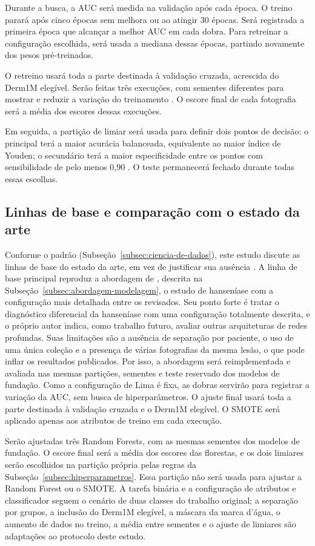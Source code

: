 Durante a busca, a AUC será medida na validação após cada época. O treino
parará após cinco épocas sem melhora ou ao atingir 30 épocas. Será
registrada a primeira época que alcançar a melhor AUC em cada dobra. Para
retreinar a configuração escolhida, será usada a mediana dessas épocas,
partindo novamente dos pesos pré-treinados.

O retreino usará toda a parte destinada à validação cruzada, acrescida do
Derm1M elegível. Serão feitas três execuções, com sementes diferentes para
mostrar e reduzir a variação do treinamento \cite{bouthillier2021}. O escore
final de cada fotografia será a média dos escores dessas execuções.

Em seguida, a partição de limiar será usada para definir dois pontos de
decisão: o principal terá a maior acurácia balanceada, equivalente ao maior
índice de Youden; o secundário terá a maior especificidade entre os pontos
com sensibilidade de pelo menos 0,90 \cite{unal2017}. O teste permanecerá
fechado durante todas essas escolhas.

\subsection{Linhas de base e comparação com o estado da arte}
\label{subsec:linhas-base}

Conforme o padrão (Subseção~\ref{subsec:ciencia-de-dados}), este estudo
discute as linhas de base do estado da arte, em vez de justificar sua
ausência \cite{acmSigsoftDataScience}. A linha de base principal reproduz a
abordagem de , descrita na
Subseção~\ref{subsec:abordagem-modelagem}, o estudo de hanseníase com a
configuração mais detalhada entre os revisados. Seu
ponto forte é tratar o diagnóstico diferencial da hanseníase com uma
configuração totalmente descrita, e o próprio autor indica, como trabalho
futuro, avaliar outras arquiteturas de redes profundas. Suas limitações
são a ausência de separação por paciente, o uso de uma única coleção e a
presença de várias fotografias da mesma lesão, o que pode inflar os
resultados publicados. Por isso, a abordagem será reimplementada e avaliada
nas mesmas partições, sementes e teste reservado dos modelos de fundação.
Como a configuração de Lima é fixa, as dobras servirão para registrar a
variação da AUC, sem busca de hiperparâmetros. O ajuste final usará toda a
parte destinada à validação cruzada e o Derm1M elegível. O SMOTE será
aplicado apenas aos atributos de treino em cada execução.

Serão ajustadas três Random Forests, com as mesmas sementes dos modelos de
fundação. O escore final será a média dos escores das florestas, e os dois
limiares serão escolhidos na partição própria pelas regras da
Subseção~\ref{subsec:hiperparametros}. Essa partição não será usada para
ajustar a Random Forest ou o SMOTE. A tarefa binária e a
configuração de atributos e classificador seguem o cenário de duas classes
do trabalho original; a separação por grupos, a inclusão do Derm1M elegível,
a máscara da marca d'água, o aumento de dados no treino, a média entre
sementes e o ajuste de limiares são
adaptações ao protocolo deste estudo.

